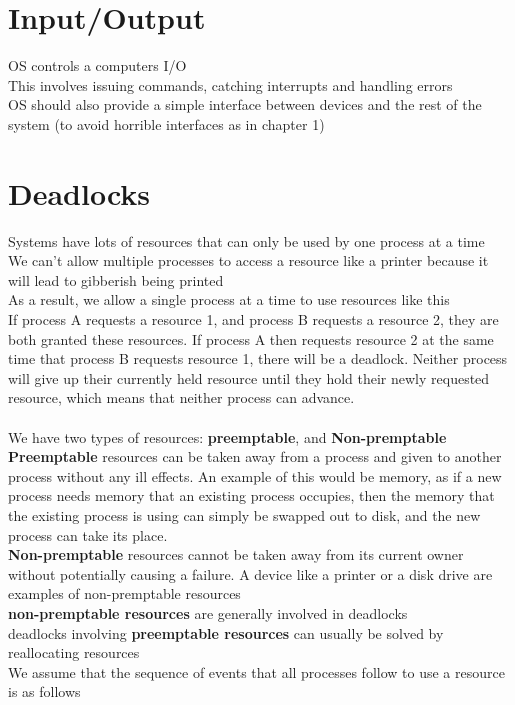 \documentclass{article}
\begin{document}
\section{Input/Output}
OS controls a computers I/O
\\This involves issuing commands, catching interrupts and handling errors
\\OS should also provide a simple interface between devices and the rest of the system (to avoid horrible interfaces as in chapter 1)

\section{Deadlocks}
Systems have lots of resources that can only be used by one process at a time
\\We can't allow multiple processes to access a resource like a printer because it will lead to gibberish being printed
\\As a result, we allow a single process at a time to use resources like this
\\If process A requests a resource 1, and process B requests a resource 2, they are both granted these resources. If process A then requests resource 2 at the same time that process B requests resource 1, there will be a deadlock. Neither process will give up their currently held resource until they hold their newly requested resource, which means that neither process can advance.
\\
\\We have two types of resources: \textbf{preemptable}, and \textbf{Non-premptable}
\\\textbf{Preemptable} resources can be taken away from a process and given to another process without any ill effects. An example of this would be memory, as if a new process needs memory that an existing process occupies, then the memory that the existing process is using can simply be swapped out to disk, and the new process can take its place.
\\\textbf{Non-premptable} resources cannot be taken away from its current owner without potentially causing a failure. A device like a printer or a disk drive are examples of non-premptable resources
\\\textbf{non-premptable resources} are generally involved in deadlocks
\\deadlocks involving \textbf{preemptable resources} can usually be solved by reallocating resources
\\We assume that the sequence of events that all processes follow to use a resource is as follows
\end{document}
